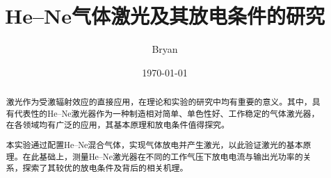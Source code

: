 \documentclass[aps,pre,12pt,preprint,%
	onecolumn,showpacs,showkeys,nofootinbib]{revtex4-1}
\begin{document}
	\title{%
	\texstringonly{\hfil\\[2\baselineskip]}
	\sf\LARGE%
		He--Ne气体激光及其放电条件的研究%
	\texstringonly{\vspace{3ex}}}
	\author{\fangsong\large%
		Bryan%
	\vspace{2mm}}
	\date{\today}

\begin{abstract}
\vspace{10mm}
\begin{spacing}{1.5}\normalsize
\setlength{\parskip}{.3\baselineskip}
%
	激光作为受激辐射效应的直接应用，在理论和实验的研究中均有重要的意义。其中，具有代表性的He--Ne激光器作为一种制造相对简单、单色性好、工作稳定的气体激光器，在各领域均有广泛的应用，其基本原理和放电条件值得探究。
	
	本实验通过配置He--Ne混合气体，实现气体放电并产生激光，以此验证激光的基本原理。在此基础上，测量He--Ne激光器在不同的工作气压下放电电流与输出光功率的关系，探索了其较优的放电条件及背后的相关机理。
\end{spacing}
\end{abstract}

\maketitle
\thispagestyle{titlepagestyle}
%
\end{document}
